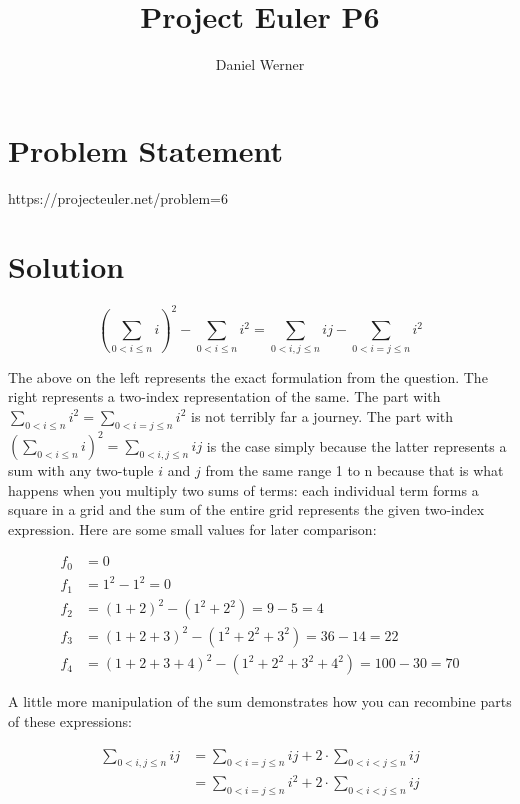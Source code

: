 \documentclass{article}
\title{Project Euler P6}
\author{Daniel Werner}
\begin{document}
\maketitle

\section*{Problem Statement}

https://projecteuler.net/problem=6

\section*{Solution}

\begin{equation*}
    \left( \sum_{0 < i \le n} i \right)^2 
    - \sum_{0 < i \le n} i^2 =
    \sum_{0 < i, j \le n} i j
    - \sum_{0 < i = j \le n} i^2
\end{equation*}

The above on the left represents the exact formulation
from the question.  The right represents a two-index
representation of the same.  The part with
$\sum_{0 < i \le n} i^2 = \sum_{0 < i = j \le n} i^2$
is not terribly far a journey.  The part with 
$\left( \sum_{0 < i \le n} i \right)^2
= \sum_{0 < i, j \le n} i j$ is the case simply because
the latter represents a sum with any two-tuple $i$ and
$j$ from the same range 1 to n because that is what
happens when you multiply two sums of terms: each
individual term forms a square in a grid and the sum of the
entire grid represents the given two-index expression.  Here
are some small values for later comparison:

\begin{align*}
    f_0 &= 0 \\
    f_1 &= 1^2 - 1^2 = 0 \\
    f_2 &= (1 + 2)^2 - (1^2 + 2^2) = 9 - 5 = 4 \\
    f_3 &= (1 + 2 + 3)^2 - (1^2 + 2^2 + 3^2) = 36 - 14 = 22 \\
    f_4 &= (1 + 2 + 3 + 4)^2 - (1^2 + 2^2 + 3^2 + 4^2) = 100 - 30 = 70
\end{align*}

A little more
manipulation of the sum demonstrates how you can recombine
parts of these expressions:

\begin{align*}
    \sum_{0 < i, j \le n} i j
    &=
    \sum_{0 < i=j \le n} i j
    + 2 \cdot \sum_{0 < i < j \le n} i j
    \\
    &=
    \sum_{0 < i = j \le n} i^2
    + 2 \cdot \sum_{0 < i < j \le n} i j
\end{align*}
\end{document}

